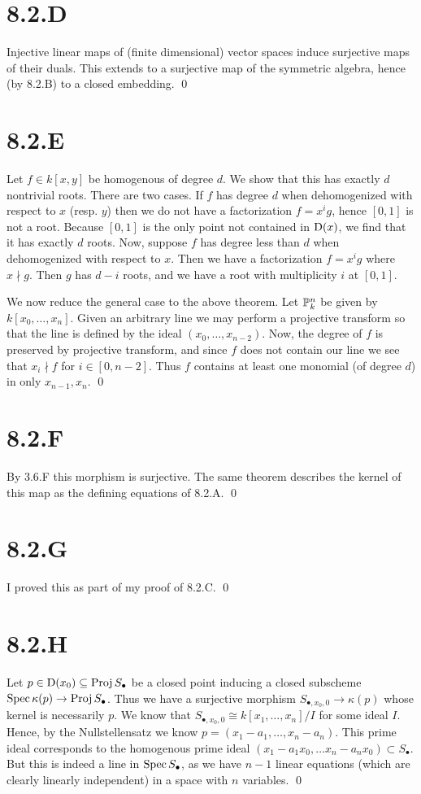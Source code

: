 \documentclass{article}
\begin{document}
\section{8.2.D}
Injective linear maps of (finite dimensional) vector spaces induce surjective
maps of their duals. This extends to a surjective map of the symmetric algebra,
hence (by 8.2.B) to a closed embedding. \qed

\section{8.2.E}
Let $f \in k[x, y]$ be homogenous of degree $d$. We
show that this has exactly $d$ nontrivial roots. There are
two cases. If $f$ has degree $d$ when
dehomogenized with respect to $x$ (resp.
$y$) then we do not have a factorization
$f=x^ig$, hence $[0, 1]$ is not a root. Because
$[0, 1]$ is the only point not contained in
$\D(x)$, we find that it has exactly $d$
roots. Now, suppose $f$ has degree less than
$d$ when dehomogenized with respect to
$x$. Then we have a factorization $f=x^ig$
where $x \nmid g$. Then $g$ has
$d-i$ roots, and we have a root with multiplicity
$i$ at $[0, 1]$.

We now reduce the general case to the above theorem. Let
$\P^n_k$ be given by $k[x_0, \dots, x_n]$. Given an arbitrary
line we may perform a projective transform so that the line is defined by the
ideal $(x_0, \dots, x_{n-2})$. Now, the degree of $f$ is
preserved by projective transform, and since $f$ does not
contain our line we see that $x_i \nmid f$ for
$i \in [0, n-2]$. Thus $f$ contains at least one
monomial (of degree $d$) in only $x_{n-1}, x_n$.
\qed

\section{8.2.F}
By 3.6.F this morphism is surjective. The same theorem describes the kernel of
this map as the defining equations of 8.2.A. \qed

\section{8.2.G}
I proved this as part of my proof of 8.2.C. \qed

\section{8.2.H}
Let $p \in \D(x_0) \subseteq \Proj S_{\bullet}$ be a closed point inducing a closed subscheme
$\Spec \kappa(p) \to \Proj S_{\bullet}$. Thus we have a surjective morphism
$S_{\bullet, x_0, 0} \to \kappa(p)$ whose kernel is necessarily $p$. We
know that $S_{\bullet, x_0, 0} \cong k[x_1, \dots, x_n]/I$ for some ideal $I$.
Hence, by the Nullstellensatz we know $p=(x_1-a_1, \dots, x_n-a_n)$. This prime ideal
corresponds to the homogenous prime ideal $(x_1-a_1x_0, \dots x_n-a_nx_0) \subset S_{\bullet}$. But this is
indeed a line in $\Spec S_{\bullet}$, as we have $n-1$
linear equations (which are clearly linearly independent) in a space with
$n$ variables. \qed
\end{document}

